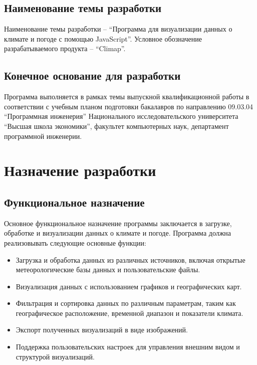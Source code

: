 \documentclass[a4paper, 12pt]{article}
\begin{document}
	\subsection{Наименование темы разработки}\label{section:2.2}

	Наименование темы разработки – \enquote{Программа для визуализации данных о климате и погоде с помощью JavaScript}. Условное
	обозначение разрабатываемого продукта – \enquote{Climap}.

	\subsection{Конечное основание для разработки}\label{section:2.3}

	Программа выполняется в рамках темы выпускной квалификационной работы в соответствии с учебным планом подготовки бакалавров
	по направлению 09.03.04 \enquote{Программная инженерия} Национального исследовательского университета \enquote{Высшая школа экономики},
	факультет компьютерных наук, департамент программной инженерии.

	\section{Назначение разработки}\label{section:3}

	\subsection{Функциональное назначение}\label{section:3.1}

	Основное функциональное назначение программы заключается в загрузке, обработке и визуализации данных о климате и
	погоде. Программа должна реализовывать следующие основные функции:
	\begin{itemize}
		\item Загрузка и обработка данных из различных источников, включая открытые метеорологические базы данных и
			пользовательские файлы.

		\item Визуализация данных с использованием графиков и географических карт.

		\item Фильтрация и сортировка данных по различным параметрам, таким как географическое расположение, временной диапазон
			и показатели климата.

		\item Экспорт полученных визуализаций в виде изображений.

		\item Поддержка пользовательских настроек для управления внешним видом и структурой визуализаций.
	\end{itemize}
\end{document}
